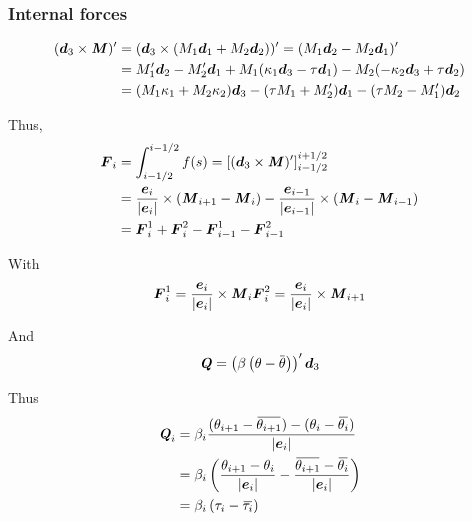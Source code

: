 \subsubsection{Internal forces}


\begin{equation}
	\begin{aligned}
	 (\boldsymbol{d}_3 \times \boldsymbol{\mathit{M}})' 
	 &= (\boldsymbol{d}_3 \times (M_1 \boldsymbol{d}_1 + M_2 \boldsymbol{d}_2))' 
	 = (M_1 \boldsymbol{d}_2 - M_2 \boldsymbol{d}_1 )' \\
	 &= M_1' \boldsymbol{d}_2 - M_2' \boldsymbol{d}_1 
	 + M_1 (\kappa_{1}\boldsymbol{d}_3 - \tau\boldsymbol{d}_1)
	 - M_2(-\kappa_{2}\boldsymbol{d}_3 + \tau\boldsymbol{d}_2) \\
	 &= (M_1\kappa_1 + M_2\kappa_2)\boldsymbol{d}_3 - (\tau M_1 + M_2')\boldsymbol{d}_1 - (\tau M_2 - M_1')\boldsymbol{d}_2  
	 \end{aligned}
\end{equation}

Thus,
\begin{equation}
	\begin{aligned}
	\boldsymbol{F}_i 
	&= \int_{i-1/2}^{i-1/2} f(s)  = \left[(\boldsymbol{d}_3 \times \boldsymbol{\mathit{M}})'\right]_{i-1/2}^{i+1/2} \\
	&= \frac{\boldsymbol{e}_i}{|\boldsymbol{e}_i|} \times (\boldsymbol{\mathit{M}}_{i+1} - \boldsymbol{\mathit{M}}_{i}) - 
		\frac{\boldsymbol{e}_{i-1}}{|\boldsymbol{e}_{i-1}|} \times (\boldsymbol{\mathit{M}}_{i} - \boldsymbol{\mathit{M}}_{i-1}) \\
	&= \boldsymbol{F}^1_{i} + \boldsymbol{F}^2_{i} - \boldsymbol{F}^1_{i-1} - \boldsymbol{F}^2_{i-1}
	\end{aligned}
\end{equation}

With
\begin{equation}
	\boldsymbol{F}^1_i = \frac{\boldsymbol{e}_i}{|\boldsymbol{e}_i|} \times \boldsymbol{\mathit{M}}_{i} \\
	\boldsymbol{F}^2_i = \frac{\boldsymbol{e}_i}{|\boldsymbol{e}_i|} \times \boldsymbol{\mathit{M}}_{i+1}
\end{equation}

And
\begin{equation}
	\mat{Q} = \left(\beta\left(\theta - \overbar{\theta}\right)\right)' \vect{d}_3
\end{equation}

Thus
\begin{equation}
	\begin{aligned}
	\mat{Q}_i &= \beta_i \frac{(\theta_{i+1} - \overbar{\theta_{i+1}})-(\theta_{i} - \overbar{\theta_{i}})}{|\vect{e}_i|}\\
	&= \beta_i \left(\frac{\theta_{i+1} - \theta_{i}}{|\vect{e}_i|}-\frac{\overbar{\theta_{i+1}} - \overbar{\theta_{i}}}{|\vect{e}_i|}\right) \\
	&= \beta_i \left(\tau_{i} - \overbar{\tau_{i}}\right) \\
	\end{aligned}
\end{equation}

